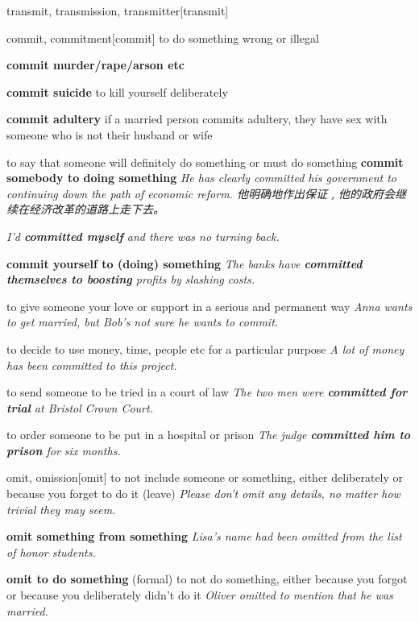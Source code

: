 \begin{DefWord}{transmit, transmission, transmitter}[transmit]
\end{DefWord}

\begin{DefWord}{commit, commitment}[commit]
    to do something wrong or illegal

    \textbf{commit murder/rape/arson etc}

    \textbf{commit suicide} to kill yourself deliberately

    \textbf{commit adultery} if a married person commits adultery, they have sex with someone who is not their husband or wife

    to say that someone will definitely do something or must do something
    \textbf{commit somebody to doing something}
    \textit{He has clearly committed his government to continuing down the path of economic reform. 他明确地作出保证﹐他的政府会继续在经济改革的道路上走下去。}

    \textit{I’d \textbf{committed myself} and there was no turning back.}

    \textbf{commit yourself to (doing) something} 
    \textit{The banks have \textbf{committed themselves to boosting} profits by slashing costs.}

    to give someone your love or support in a serious and permanent way
    \textit{Anna wants to get married, but Bob’s not sure he wants to commit.}

    to decide to use money, time, people etc for a particular purpose
    \textit{A lot of money has been committed to this project.}

    to send someone to be tried in a court of law
    \textit{The two men were \textbf{committed for trial} at Bristol Crown Court.}

    to order someone to be put in a hospital or prison
    \textit{The judge \textbf{committed him to prison} for six months.}
\end{DefWord}

\begin{DefWord}{omit, omission}[omit]
    to not include someone or something, either deliberately or because you forget to do it (leave)
    \textit{Please don’t omit any details, no matter how trivial they may seem.}

    \textbf{omit something from something}
    \textit{Lisa’s name had been omitted from the list of honor students.}

    \textbf{omit to do something} (formal) to not do something, either because you forgot or because you deliberately didn’t do it
    \textit{Oliver omitted to mention that he was married.}
\end{DefWord}

